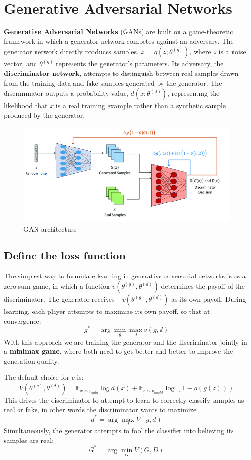 \section{Generative Adversarial Networks}
\textbf{Generative Adversarial Networks} (GANs) are built on a game-theoretic
framework in which a generator network competes against an adversary. The generator
network directly produces samples, $x = g(z; \theta^{(g)})$, where $z$ is a noise
vector, and $\theta^{(g)}$ represents the generator's parameters. Its adversary,
the \textbf{discriminator network}, attempts to distinguish between real samples
drawn from the training data and fake samples generated by the generator. The
discriminator outputs a probability value, $d(x; \theta^{(d)})$, representing the
likelihood that $x$ is a real training example rather than a synthetic sample
produced by the generator.
\begin{figure}[!ht]
    \centering
    \includegraphics[width=0.5\linewidth]{img/GAN.png}
    \caption{GAN architecture}
    \label{fig:ganArch}
\end{figure}

\subsection{Define the loss function}
The simplest way to formulate learning in generative adversarial networks is as
a zero-sum game, in which a function $v(\theta^{(g)}, \theta^{(d)})$ determines
the payoff of the discriminator. The generator receives $- v(\theta^{(g)}, \theta^{(d)})$
as its own payoff. During learning, each player attempts to maximize its own
payoff, so that at convergence:
\begin{equation}
    g^\ast = \arg \min_{g} \max_{d} v(g, d)
\end{equation}
With this approach we are training the generator and the discriminator jointly
in a \textbf{minimax game}, where both need to get better and better to improve
the generation quality.

The default choice for $v$ is:
\begin{equation}
    V(\theta^{(g)}, \theta^{(d)}) = \mathbb{E}_{x \sim p_{data}} \log d(x) + \mathbb{E}_{z \sim p_{model}} \log(1 - d(g(z)))
\end{equation}
This drives the discriminator to attempt to learn to correctly classify samples
as real or fake, in other words the discriminator wants to maximize:
\begin{equation*}
    d^\ast = \arg \max_d V(g,d)
\end{equation*}
Simultaneously, the generator attempts to fool the classifier into believing its
samples are real:
\begin{equation*}
    G^\ast = \arg \min_G V(G,D)
\end{equation*}

